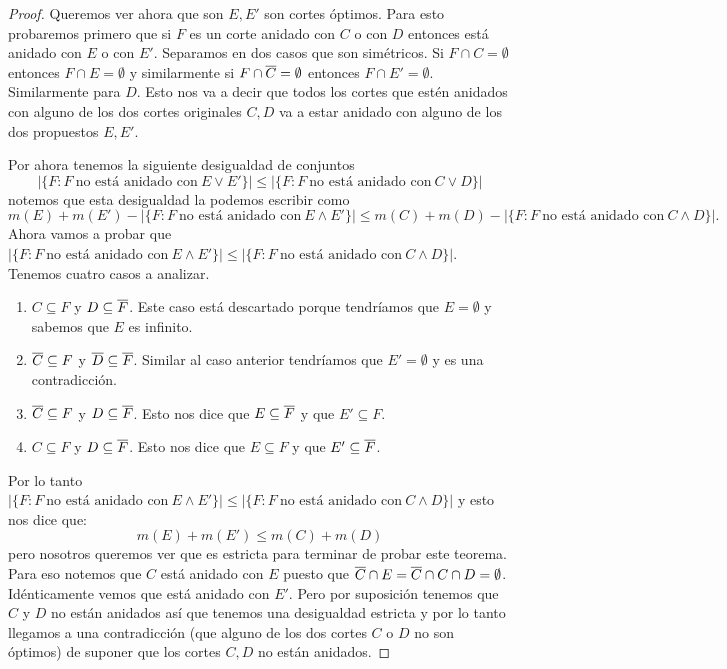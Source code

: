 \documentclass[tesis.tex]{subfiles}
\begin{document}
\begin{proof}
	
	Queremos ver ahora que son $E,E'$ son cortes óptimos.	
	Para esto probaremos primero que si $F$ es un corte anidado con $C$ o con $D$ entonces está anidado con $E$ o con $E'$.
	Separamos en dos casos que son simétricos.
	Si $F \cap C = \emptyset$ entonces $F \cap E= \emptyset$ y similarmente si $F \cap \overline C = \emptyset$ entonces $F \cap E' = \emptyset$.
	Similarmente para $D$.
	Esto nos va a decir que todos los cortes que estén anidados con alguno de los dos cortes originales $C,D$ va a estar anidado con alguno de los dos propuestos $E,E'$.
	
	Por ahora tenemos la siguiente desigualdad de conjuntos
	\[
		|\{ F : F \ \text{no está anidado con} \ E \lor E' \}| \le |\{ F : F \  \text{no está anidado con} \ C \lor D \}|
	\]
	notemos que esta desigualdad la podemos escribir como
	\[
		m(E) + m(E') - |\{ F : F \ \text{no está anidado con} \ E \land E' \}| \le m(C) + m(D) - |\{ F : F \ \text{no está anidado con} \ C \land D \}|.
	\] 
	Ahora vamos a probar que $|\{ F : F \ \text{no está anidado con} \ E \land E' \}| \le |\{ F : F \ \text{no está anidado con} \ C \land D \}|$.
	Tenemos cuatro casos a analizar.
	\begin{enumerate}
		\item $C \subseteq F$ y $D \subseteq \overline F$.
		Este caso está descartado porque tendríamos que $E=\emptyset$ y sabemos que $E$ es infinito. 
		\item $\overline C \subseteq F$ y $\overline D \subseteq \overline F$.
		Similar al caso anterior tendríamos que $E' = \emptyset$ y es una contradicción.
		\item $\overline C \subseteq F$ y $D \subseteq \overline F$.
		Esto nos dice que $E \subseteq \overline F$ y que $E' \subseteq F$.
		\item $ C \subseteq F$ y $D \subseteq \overline F$.
		Esto nos dice que $E \subseteq F$ y que $E' \subseteq \overline F$.
	\end{enumerate}
	Por lo tanto $|\{ F : F \ \text{no está anidado con} \ E \land E' \}| \le |\{ F : F \ \text{no está anidado con} \ C \land D \}|$ y esto nos dice que:
	\[
		m(E) + m(E') \le m(C) + m(D)
	\]
	pero nosotros queremos ver que es estricta para terminar de probar este teorema.
	Para eso notemos que $C$ está anidado con $E$ puesto que $\overline C \cap E = \overline C \cap C \cap D = \emptyset$.
	Idénticamente vemos que está anidado con $E'$.
	Pero por suposición tenemos que $C$ y $D$ no están anidados así que tenemos una desigualdad estricta y por lo tanto llegamos a una contradicción (que alguno de los dos cortes $C$ o $D$ no son óptimos) de suponer que los cortes $C,D$ no están anidados.
\end{proof}
\end{document}
